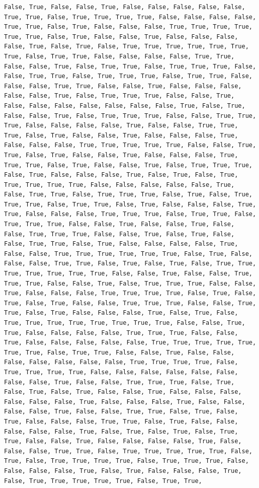 \documentclass[
  letterpaper,
  DIV=11,
  numbers=noendperiod]{scrartcl}
\begin{document}
\begin{verbatim}
False, True, False, False, True, False, False, False, False, False, True, True, False, True, True, True, True, False, False, False, False, True, True, False, True, False, False, False, True, True, True, True, True, True, False, True, False, False, True, False, False, False, False, True, False, True, False, True, True, True, True, True, True, True, False, True, True, False, False, False, False, True, True, False, False, True, False, True, True, False, True, True, True, False, False, True, True, False, True, True, True, False, True, True, False, False, False, True, True, False, False, True, False, False, False, False, False, True, False, True, True, True, False, False, True, False, False, False, False, False, False, False, True, False, True, False, False, True, False, True, True, True, False, False, True, True, True, False, False, False, False, True, False, False, True, True, True, False, True, False, False, True, False, False, False, True, False, False, False, True, True, True, True, True, False, False, True, True, False, True, False, False, True, False, False, False, True, True, True, False, True, False, False, True, False, True, True, True, False, True, False, False, False, True, False, True, False, True, True, True, True, True, False, False, False, False, False, True, False, True, True, False, True, True, True, False, True, False, True, True, True, False, True, True, False, True, False, False, False, True, True, False, False, False, True, True, True, False, True, True, False, True, True, True, False, False, True, False, False, True, False, False, True, True, True, False, False, True, False, True, False, False, True, True, False, True, False, False, False, False, True, False, False, True, True, True, True, True, True, False, True, False, False, False, True, True, False, True, False, True, False, True, True, True, True, True, True, True, False, False, True, False, False, True, True, True, False, False, True, False, True, True, True, False, False, True, False, False, False, True, True, True, True, False, True, False, True, False, True, False, False, True, True, True, False, False, True, True, False, True, False, False, False, True, False, True, False, True, True, True, True, True, True, True, True, False, False, True, True, False, False, False, False, True, True, True, False, False, True, False, False, False, False, False, True, True, True, True, True, True, True, False, True, True, False, False, True, False, False, False, False, False, False, False, True, True, True, True, False, True, True, True, True, False, False, False, False, False, False, False, False, True, False, False, True, True, True, False, True, False, True, False, True, False, False, True, False, False, False, False, False, False, True, False, False, False, True, False, False, False, False, True, False, False, True, True, False, True, False, True, False, False, False, True, True, False, True, False, False, False, False, False, True, False, True, False, True, False, True, True, False, False, True, False, False, False, False, True, False, False, False, True, True, False, True, True, True, True, True, False, True, False, True, True, True, True, False, True, True, True, False, False, False, False, True, False, True, False, False, False, True, False, True, True, True, True, True, False, True, True, 
\end{verbatim}
\end{document}

